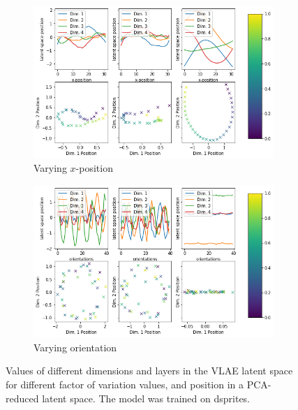 \documentclass{beamer}
\begin{document}
\begin{frame}
\begin{figure}
\centering
\begin{subfigure}{.48\textwidth}
\centering
\includegraphics[width=\textwidth]{images/latent_space_traversals/vlae_dsprites_left_latent_space_values.png}
\caption{Varying $x$-position}
\label{subfig:vlae_dsprites_latent_space_values_x}
\end{subfigure}
\hfill
\begin{subfigure}{.48\textwidth}
\centering
\includegraphics[width=\textwidth]{images/latent_space_traversals/vlae_dsprites_orientation_latent_space_values.png}
\caption{Varying orientation}
\label{subfig:vlae_dsprites_latent_space_values_orientation}
\end{subfigure}
\caption{Values of different dimensions and layers in the VLAE latent space for different factor of variation values, and position in a PCA-reduced latent space. The model was trained on dsprites.}
\end{figure}
\end{frame}
\end{document}
